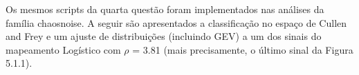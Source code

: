 \begin{figure}[ht!]
	\vspace{0mm}	%
	\begin{center}
	\end{center}
	\vspace{-2mm}	%
	\label{ex4_fig1}
\end{figure}

\clearpage
Os mesmos scripts da quarta questão foram implementados nas análises da família chaosnoise. A seguir são apresentados a classificação no espaço de Cullen and Frey e um ajuste de distribuições (incluindo GEV) a um dos sinais do mapeamento Logístico com $\rho$ = 3.81 (mais precisamente, o último sinal da Figura 5.1.1).

